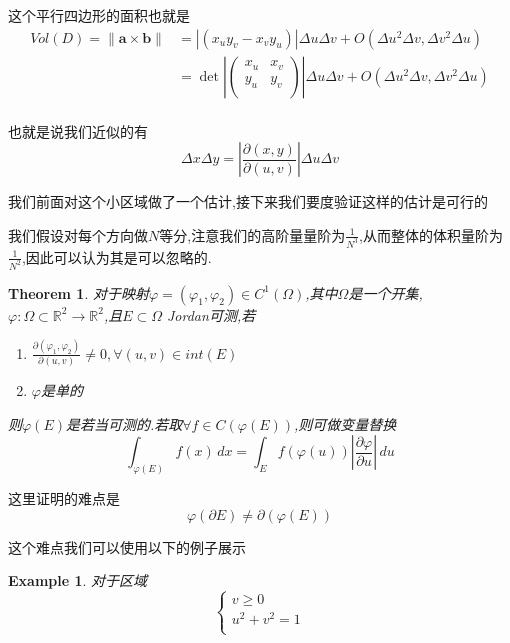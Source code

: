 \documentclass[11pt,hyperref,a4paper,UTF8]{ctexart}
\newtheorem{theorem}{Theorem}[subsection]
\newtheorem{example}{Example}[subsection]
\newcommand{\RR}{\mathbb{R}}
\newcommand{\ve}{\boldsymbol}
\begin{document}
\begin{CJK}{UTF8}{gkai}
这个平行四边形的面积也就是
\[
\begin{aligned}
Vol(D) = \|\ve{a} \times \ve{b}\| &= |(x_u y_v - x_v y_u)| \Delta u \Delta v + O(\Delta u^2 \Delta v, \Delta v^2 \Delta u)\\
&= \det \left|\begin{pmatrix}
  x_u&x_v\\
  y_u&y_v\\
\end{pmatrix}\right| \Delta u \Delta v + O(\Delta u^2 \Delta v, \Delta v^2 \Delta u) \\
\end{aligned}  \]

也就是说我们近似的有
\[\Delta x \Delta y = \left|\frac{\partial (x,y)}{\partial(u,v)}\right| \Delta u \Delta v\]

我们前面对这个小区域做了一个估计,接下来我们要度验证这样的估计是可行的

我们假设对每个方向做$N$等分,注意我们的高阶量量阶为$\frac{1}{N^3}$,从而整体的体积量阶为$\frac{1}{N^2}$,因此可以认为其是可以忽略的.

\begin{theorem}
  对于映射$\varphi = (\varphi_1,\varphi_2) \in C^1(\Omega)$,其中$\Omega$是一个开集,$\varphi : \Omega \subset \RR^2 \to \RR^2$,且$E \subset \Omega$ Jordan可测,若
  \begin{enumerate}
    \item $\frac{\partial(\varphi_1,\varphi_2)}{\partial(u,v)} \neq 0,\forall (u,v) \in int(E)$
    \item $\varphi$是单的
  \end{enumerate}
  则$\varphi(E)$是若当可测的.若取$\forall f\in C(\varphi(E))$,则可做变量替换
  \[\int_{\varphi(E)} f(x)\, dx = \int_{E} f(\varphi(u)) \left|\frac{\partial \varphi}{\partial u}\right|\, du\]
\end{theorem}

这里证明的难点是
\[\varphi(\partial E) \neq \partial(\varphi(E))\]

这个难点我们可以使用以下的例子展示

\begin{example}
  对于区域
  \[\begin{cases}
    v \geq 0\\
    u^2 + v^2 = 1\\
  \end{cases}\]

  \begin{center}
  

\end{center}
\end{example}
\end{CJK}
\end{document}
